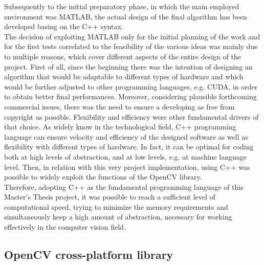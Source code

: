 Subsequently to the initial preparatory phase, in which the main employed environment was MATLAB, the actual design of the final algorithm has been developed basing on the C++ syntax.\\
The decision of exploiting MATLAB only for the initial planning of the work and for the first tests correlated to the feasibility of the various ideas was mainly due to multiple reasons, which cover different aspects of the entire design of the project.
First of all, since the beginning there was the intention of designing an algorithm that would be adaptable to different types of hardware and which would be further adjusted to other programming languages, e.g. CUDA, in order to obtain better final performances.
Moreover, considering plausible forthcoming commercial issues, there was the need to ensure a developing as free from copyright as possible. 
Flexibility and efficiency were other fundamental drivers of that choice. 
As widely know in the technological field, C++ programming language can ensure velocity and efficiency of the designed software as well as flexibility with different types of hardware.
In fact, it can be optimal for coding both at high levels of abstraction, and at low levels, e.g. at machine language level.
Then, in relation with this very project implementation, using C++ was possible to widely exploit the functions of the OpenCV library. \\
Therefore, adopting C++ as the fundamental programming language of this Master's Thesis project, it was possible to reach a sufficient level of computational speed, trying to minimize the memory requirements and simultaneously keep a high amount of abstraction, necessary for working effectively in the computer vision field. 

\subsection{OpenCV cross-platform library}
\label{subsection:opencv-env}

